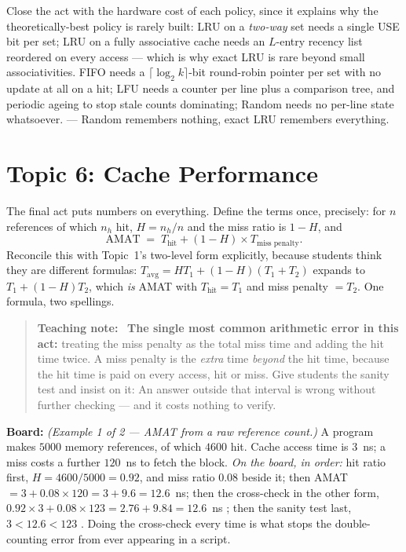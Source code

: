\documentclass[11pt]{article}
\newenvironment{teachingaside}{\begin{quote}\small\color{primary-gold}\textbf{Teaching note:}\ }{\end{quote}}
\begin{document}
Close the act with the hardware cost of each policy, since it explains why the theoretically-best policy is rarely built: LRU on a \emph{two-way} set needs a single USE bit per set; LRU on a fully associative cache needs an $L$-entry recency list reordered on every access --- which is why exact LRU is rare beyond small associativities. FIFO needs a $\lceil \log_2 k \rceil$-bit round-robin pointer per set with no update at all on a hit; LFU needs a counter per line plus a comparison tree, and periodic ageing to stop stale counts dominating; Random needs no per-line state whatsoever.  --- Random remembers nothing, exact LRU remembers everything.

\section{Topic 6: Cache Performance}

The final act puts numbers on everything. Define the terms once, precisely: for $n$ references of which $n_h$ hit, $H = n_h/n$ and the miss ratio is $1 - H$, and
\[
  \text{AMAT} \;=\; T_{\text{hit}} + (1-H)\times T_{\text{miss penalty}} .
\]
Reconcile this with Topic~1's two-level form explicitly, because students think they are different formulas: $T_{\text{avg}} = HT_1 + (1-H)(T_1+T_2)$ expands to $T_1 + (1-H)T_2$, which \emph{is} AMAT with $T_{\text{hit}} = T_1$ and miss penalty $= T_2$. One formula, two spellings.

\begin{teachingaside}
\textbf{The single most common arithmetic error in this act:} treating the miss penalty as the total miss time and adding the hit time twice. A miss penalty is the \emph{extra} time \emph{beyond} the hit time, because the hit time is paid on every access, hit or miss. Give students the sanity test and insist on it:  An answer outside that interval is wrong without further checking --- and it costs nothing to verify.
\end{teachingaside}

\textbf{Board:} \textit{(Example 1 of 2 --- AMAT from a raw reference count.)} A program makes $5000$ memory references, of which $4600$ hit. Cache access time is $3$~ns; a miss costs a further $120$~ns to fetch the block. \emph{On the board, in order:} hit ratio first, $H = 4600/5000 = 0.92$, and miss ratio $0.08$ beside it; then AMAT $= 3 + 0.08\times 120 = 3 + 9.6 = 12.6$~ns; then the cross-check in the other form, $0.92\times 3 + 0.08\times 123 = 2.76 + 9.84 = 12.6$~ns \good{\checkmark}; then the sanity test last, $3 < 12.6 < 123$ \good{\checkmark}. Doing the cross-check every time is what stops the double-counting error from ever appearing in a script.
\end{document}
